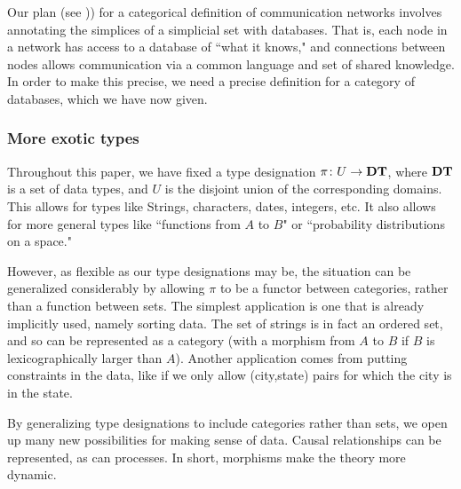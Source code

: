 \documentclass{amsart}
\def\DT{{\bf DT}}
\begin{document}
Our plan (see \cite{Spi2})) for a categorical definition of communication networks involves annotating the simplices of a simplicial set with databases.  That is, each node in a network has access to a database of ``what it knows," and connections between nodes allows communication via a common language and set of shared knowledge.  In order to make this precise, we need a precise definition for a category of databases, which we have now given.  

\subsubsection{More exotic types}\label{subsubsec:types}

Throughout this paper, we have fixed a type designation $\pi\taking U\to\DT$, where $\DT$ is a set of data types, and $U$ is the disjoint union of the corresponding domains.  This allows for types like Strings, characters, dates, integers, etc.  It also allows for more general types like ``functions from $A$ to $B$" or ``probability distributions on a space."  

However, as flexible as our type designations may be, the situation can be generalized considerably by allowing $\pi$ to be a functor between categories, rather than a function between sets.  The simplest application is one that is already implicitly used, namely sorting data.  The set of strings is in fact an ordered set, and so can be represented as a category (with a morphism from $A$ to $B$ if $B$ is lexicographically larger than $A$).  Another application comes from putting constraints in the data, like if we only allow (city,state) pairs for which the city is in the state. 

By generalizing type designations to include categories rather than sets, we open up many new possibilities for making sense of data.  Causal relationships can be represented, as can processes.  In short, morphisms make the theory more dynamic.  




\end{document}
